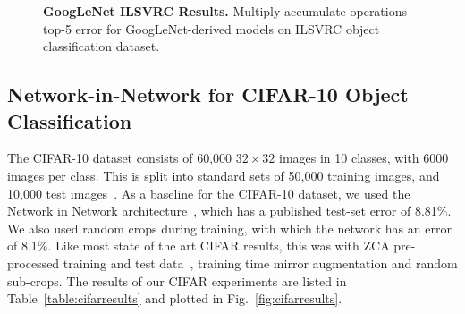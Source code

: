 \documentclass[thesis]{subfiles}
\begin{document}
    \begin{figure}[htbp] 
        \centering
        \datatable
        
        
        \caption{\textbf{GoogLeNet ILSVRC Results.} Multiply-accumulate operations \vs top-5 error for GoogLeNet-derived models on ILSVRC object classification dataset.}
        \label{fig:googlenetimagenetresults}
    \end{figure}
    
    \subsection{Network-in-Network for CIFAR-10 Object Classification}
    The CIFAR-10 dataset consists of 60,000 $32\times 32$ images in 10 classes, with 6000 images per class. This is split into standard sets of 50,000 training images, and 10,000 test images~\citep{krizhevsky2009learning}. As a baseline for the CIFAR-10 dataset, we used the Network in Network architecture~\citep{journals/corr/LinCY13}, which has a published test-set error of 8.81\%. We also used random crops during training, with which the network has an error of 8.1\%. Like most state of the art CIFAR results, this was with ZCA pre-processed training and test data~\citep{goodfellow2013maxout}, training time mirror augmentation and random sub-crops. The results of our CIFAR experiments are listed in Table~\ref{table:cifarresults} and plotted in Fig.~\ref{fig:cifarresults}.
    
\end{document}
